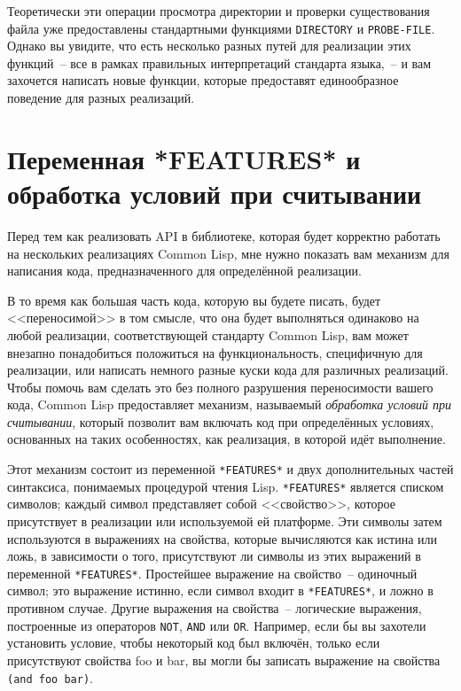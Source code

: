 Теоретически эти операции просмотра директории и проверки существования файла уже
предоставлены стандартными функциями \lstinline{DIRECTORY} и \lstinline{PROBE-FILE}. Однако вы
увидите, что есть несколько разных путей для реализации этих функций~-- все в рамках
правильных интерпретаций стандарта языка,~-- и вам захочется написать новые функции,
которые предоставят единообразное поведение для разных реализаций.

\section{Переменная *FEATURES* и обработка условий при считывании}

Перед тем как реализовать API в библиотеке, которая будет корректно работать на
нескольких реализациях Common Lisp, мне нужно показать вам механизм для напи\-са\-ния кода,
предназначенного для определённой реализации.

В то время как большая часть кода, которую вы будете писать, будет <<переносимой>> в том
смысле, что она будет выполняться одинаково на любой реализации, соответствующей стандарту
Common Lisp, вам может внезапно понадобиться положиться на функциональность, специфичную
для реализации, или написать немного разные куски кода для различных реализаций. Чтобы
помочь вам сделать это без полного разрушения переносимости вашего кода, Common Lisp
предоставляет механизм, называемый \textit{обработка условий при считывании}, который
позволит вам включать код при определённых условиях, основанных на таких особенностях, как
реализация, в которой идёт выполнение.

Этот механизм состоит из переменной \lstinline{*FEATURES*} и двух дополнительных частей
синтаксиса, понимаемых процедурой чтения Lisp. \lstinline{*FEATURES*} является списком символов;
каждый символ представляет собой <<свойство>>, которое присутствует в реализации или
используемой ей платформе. Эти символы затем используются в выражениях на свойства,
которые вычисляются как истина или ложь, в зависимости о того, присутствуют ли символы из
этих выражений в переменной \lstinline{*FEATURES*}. Простейшее выражение на свойство~--
одиночный символ; это выражение истинно, если символ входит в \lstinline{*FEATURES*}, и ложно в
противном случае. Другие выражения на свойства~-- логические выражения, построенные из
операторов \lstinline{NOT}, \lstinline{AND} или \lstinline{OR}. Например, если бы вы захотели установить
условие, чтобы некоторый код был включён, только если присутствуют свойства foo и bar, вы
могли бы записать выражение на свойства \lstinline{(and foo bar)}.

